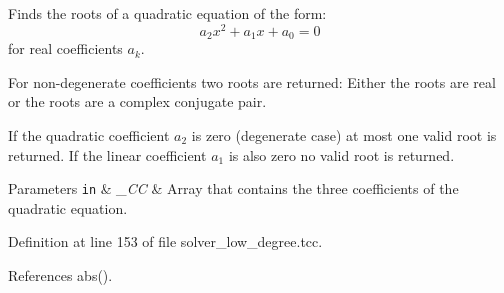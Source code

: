 Finds the roots of a quadratic equation of the form\+: \[ a_2 x^2 + a_1 x + a_0 = 0 \] for real coefficients $ a_k $. 

For non-\/degenerate coefficients two roots are returned\+: Either the roots are real or the roots are a complex conjugate pair.

If the quadratic coefficient $ a_2 $ is zero (degenerate case) at most one valid root is returned. If the linear coefficient $ a_1 $ is also zero no valid root is returned.


\begin{DoxyParams}[1]{Parameters}
\mbox{\tt in}  & {\em \+\_\+\+CC} & Array that contains the three coefficients of the quadratic equation. \\
\hline
\end{DoxyParams}


Definition at line 153 of file solver\+\_\+low\+\_\+degree.\+tcc.



References abs().


